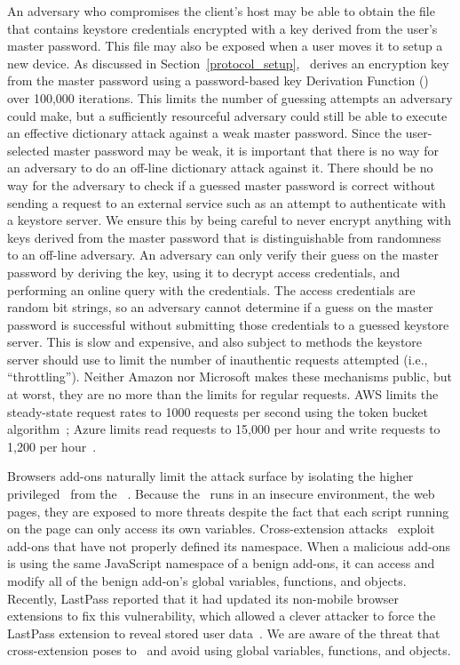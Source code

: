 An adversary who compromises the client's host may be able to obtain the  file that contains keystore credentials encrypted with a key derived from the user's master password.  This file may also be exposed when a user moves it to setup a new device. As discussed in Section~\ref{protocol_setup}, \SecPass\ derives an encryption key from the master password using a password-based key Derivation Function () over 100,000 iterations. This limits the number of guessing attempts an adversary could make, but a sufficiently resourceful adversary could still be able to execute an effective dictionary attack against a weak master password. Since the user-selected master password may be weak, it is important that there is no way for 
an adversary to do an off-line dictionary attack against it. There should be no way  for the adversary to check if a guessed master password is correct without sending a request 
to an external service such as an attempt to authenticate with a keystore server. We ensure this by being careful to never encrypt anything with keys derived from the master password that is distinguishable from randomness to an off-line adversary. An adversary can only 
verify their guess on the master password by deriving the key, using it to decrypt access  credentials, and performing an online query with the credentials. The access credentials are 
random bit strings, so an adversary cannot determine if a guess on the master password is 
successful without submitting those credentials to a guessed keystore server. This is slow and expensive, and also subject to methods the keystore server should use to limit the number of inauthentic requests attempted (i.e., ``throttling''). Neither Amazon nor Microsoft makes these mechanisms public, but at worst, they are no more than the limits for regular requests. AWS limits the steady-state request rates to 1000 requests per second using the token bucket algorithm~\cite{AWSthrottle}; Azure limits read requests to 15,000 per hour and write requests to 1,200 per hour~\cite{Azurethrottle}. 

Browsers add-ons naturally limit the attack surface by isolating the higher privileged \Core\ from the \UI~\cite{barth2010protecting}. Because the \UI\ runs in an insecure environment, the web pages, they are exposed to more threats despite the fact that each script running on the page can only access its own variables. Cross-extension attacks~\cite{buyukkayhan2016crossfire} exploit add-ons that have not properly defined its namespace. When a malicious add-ons is using the same JavaScript namespace of a benign add-ons, it can access and modify all of the benign add-on's global variables, functions, and objects. Recently, LastPass reported that it had updated its non-mobile browser extensions to fix this vulnerability, which allowed a clever attacker to force the LastPass extension to reveal stored user data~\cite{LastpassSecurityUpdated}. We are aware of the threat that cross-extension poses to \SecPass\ and avoid using global variables, functions, and objects.

